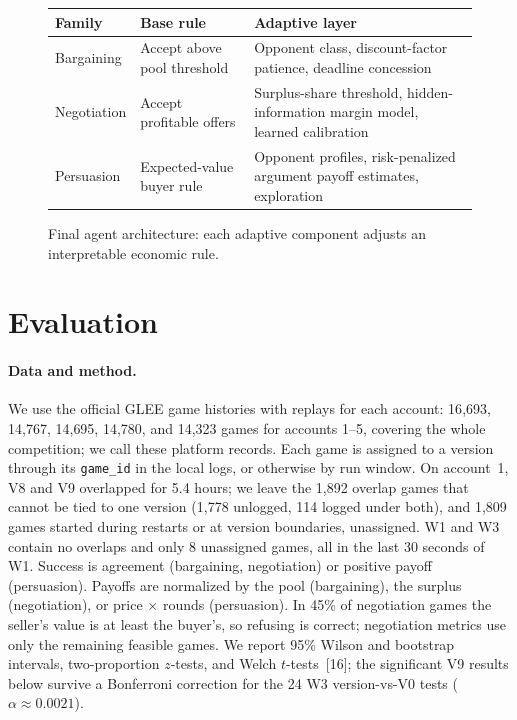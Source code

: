 \documentclass{article}
\begin{document}
\begin{figure}[!t]
\centering
\small
\begin{tabular}{>{\raggedright\arraybackslash}p{1.05in}>{\raggedright\arraybackslash}p{1.25in}p{2.7in}}
\toprule
Family & Base rule & Adaptive layer \\
\midrule
Bargaining & Accept above pool threshold & Opponent class, discount-factor patience, deadline concession \\
Negotiation & Accept profitable offers & Surplus-share threshold, hidden-information margin model, learned calibration \\
Persuasion & Expected-value buyer rule & Opponent profiles, risk-penalized argument payoff estimates, exploration \\
\bottomrule
\end{tabular}
\caption{Final agent architecture: each adaptive component adjusts an interpretable economic rule.}
\label{fig:architecture}
\end{figure}

\section{Evaluation}
\label{sec:eval}

\paragraph{Data and method.}
We use the official GLEE game histories with replays for each account: 16{,}693, 14{,}767, 14{,}695, 14{,}780, and 14{,}323 games for accounts 1--5, covering the whole competition; we call these platform records. Each game is assigned to a version through its \texttt{game\_id} in the local logs, or otherwise by run window. On account~1, V8 and V9 overlapped for 5.4 hours; we leave the 1{,}892 overlap games that cannot be tied to one version (1{,}778 unlogged, 114 logged under both), and 1{,}809 games started during restarts or at version boundaries, unassigned. W1 and W3 contain no overlaps and only 8 unassigned games, all in the last 30 seconds of W1. Success is agreement (bargaining, negotiation) or positive payoff (persuasion). Payoffs are normalized by the pool (bargaining), the surplus (negotiation), or price $\times$ rounds (persuasion). In 45\% of negotiation games the seller's value is at least the buyer's, so refusing is correct; negotiation metrics use only the remaining feasible games. We report 95\% Wilson and bootstrap intervals, two-proportion $z$-tests, and Welch $t$-tests~[16]; the significant V9 results below survive a Bonferroni correction for the 24 W3 version-vs-V0 tests ($\alpha\approx0.0021$).
\end{document}
